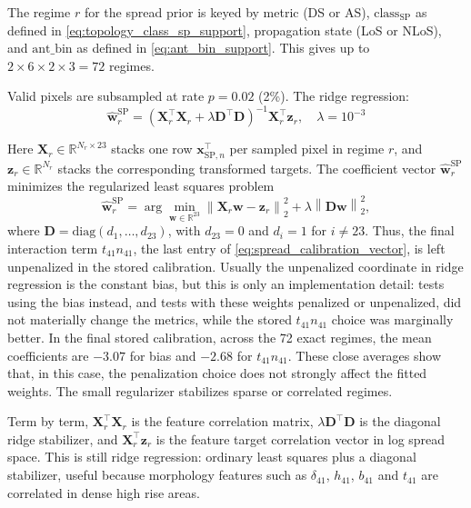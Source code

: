 The regime \(r\) for the spread prior is keyed by metric (DS or AS),
\(\mathrm{class}_{\mathrm{SP}}\) as defined in
\eqref{eq:topology_class_sp_support}, propagation state (LoS or NLoS), and
\(\mathrm{ant\_bin}\) as defined in \eqref{eq:ant_bin_support}. This gives up
to \(2 \times 6 \times 2 \times 3 = 72\) regimes.

Valid pixels are subsampled at rate $p = 0.02$ (2\%). The ridge regression:
\begin{equation}
\hat{\textbf{w}}^{\mathrm{SP}}_{r} = \left(\textbf{X}_r^\top \textbf{X}_r + \lambda \textbf{D}^\top\textbf{D}\right)^{-1}\textbf{X}_r^\top \textbf{z}_r,\quad \lambda = 10^{-3}
\label{eq:ridge}
\end{equation}

Here \(\textbf{X}_r\in\mathbb{R}^{N_r\times23}\) stacks one row
\(\textbf{x}_{\mathrm{SP},n}^{\top}\) per sampled pixel in regime \(r\), and
\(\textbf{z}_r\in\mathbb{R}^{N_r}\) stacks the corresponding transformed
targets. The coefficient vector
\(\hat{\textbf{w}}^{\mathrm{SP}}_{r}\) minimizes the regularized least squares problem
\begin{equation}
\hat{\textbf{w}}^{\mathrm{SP}}_{r}
=
\arg\min_{\textbf{w}\in\mathbb{R}^{23}}
\left\|
\textbf{X}_r\textbf{w}-\textbf{z}_r
\right\|_2^2
+
\lambda
\left\|
\textbf{D}\textbf{w}
\right\|_2^2 ,
\label{eq:spread_ridge_objective}
\end{equation}
where \(\textbf{D}=\mathrm{diag}(d_1,\ldots,d_{23})\), with \(d_{23}=0\)
and \(d_i=1\) for \(i\ne23\). Thus, the final interaction term
\(t_{41}n_{41}\), the last entry of \eqref{eq:spread_calibration_vector}, is
left unpenalized in the stored calibration. Usually the unpenalized coordinate
in ridge regression is the constant bias, but this is only an implementation
detail: tests using the bias instead, and tests with these weights penalized or
unpenalized, did not materially change the metrics, while the stored
\(t_{41}n_{41}\) choice was marginally better. In the final stored
calibration, across the 72 exact regimes, the mean coefficients are \(-3.07\)
for bias and \(-2.68\) for \(t_{41}n_{41}\). These close averages show that,
in this case, the penalization choice does not strongly affect the fitted
weights. The small regularizer stabilizes sparse or correlated regimes.

Term by term, \(\textbf{X}_r^\top\textbf{X}_r\) is the feature correlation
matrix, \(\lambda\textbf{D}^\top\textbf{D}\) is the diagonal ridge
stabilizer, and \(\textbf{X}_r^\top\textbf{z}_r\) is the feature target
correlation vector in log spread space. This is still ridge regression:
ordinary least squares plus a diagonal stabilizer, useful because morphology
features such as \(\delta_{41}\), \(h_{41}\), \(b_{41}\) and \(t_{41}\) are
correlated in dense high rise areas.

